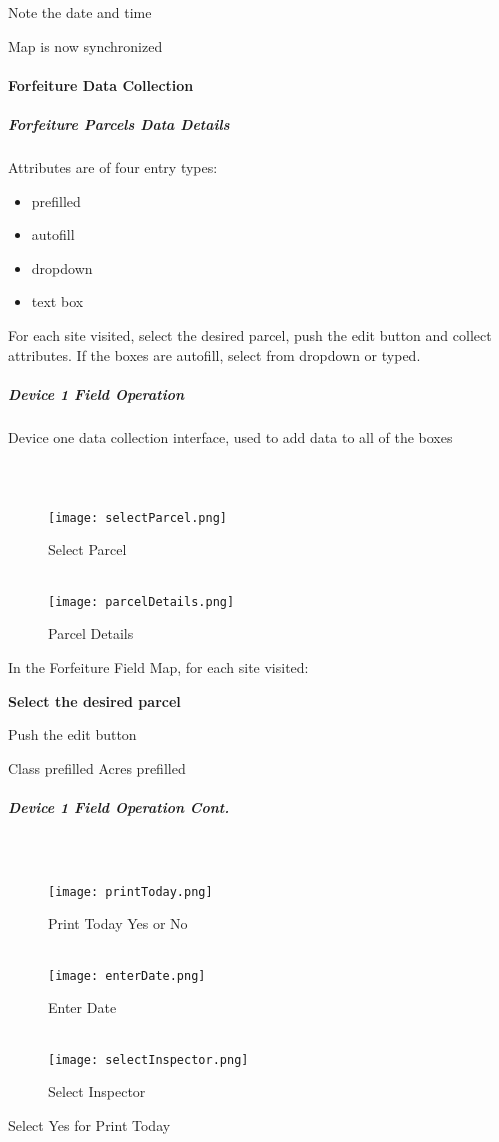 \documentclass[class=article , crop=false, titlepage, twoside, multi={itemize, figure, verbatim}, float=false]{standalone}
\begin{document}
\Large Note the date and time
\vspace{1.5in}

Map is now synchronized

\clearpage
\paragraph{Forfeiture Data Collection}
\subparagraph{Forfeiture Parcels Data Details}
Attributes are of four entry types:\begin{itemize}
\item prefilled
\item autofill
\item dropdown
\item text box \end{itemize}
For each site visited, select the desired parcel, push the edit button and collect attributes.  If the boxes are autofill, select from dropdown or typed.\bigskip 

\clearpage
\subparagraph{Device 1 Field Operation}Device one data collection interface, used to add data to all of the boxes
\subparagraph*{\\}
\begin{wrapfigure}{r}{0.5\textwidth}
\centering
\texttt{[image: selectParcel.png]}
\caption {Select Parcel}
\vspace{.25in}
\HRule \\[.4cm] %
\vspace{.25in}
\texttt{[image: parcelDetails.png]}
\caption{Parcel Details}
\end{wrapfigure}
\vspace{1in}

In the Forfeiture Field Map, for each site visited:\\
\vspace{1in}

\textbf{Select the desired parcel}
\vspace{3in}

Push the \Large edit button 

\clearpage
Class prefilled
Acres prefilled

\clearpage
\subparagraph*{Device 1 Field Operation Cont.}
\subparagraph*{\\}
\begin{wrapfigure}{r}{0.5\textwidth}
\centering
\texttt{[image: printToday.png]}
\caption {Print Today Yes or No}
\vspace{.2in}
\HRule \\[.4cm] %
\vspace{.2in}
\texttt{[image: enterDate.png]}
\caption{Enter Date}
\vspace{.2in}
\HRule \\[.4cm] %
\vspace{.2in}
\texttt{[image: selectInspector.png]}
\caption{Select Inspector}
\end{wrapfigure}
Select Yes for Print Today\\
\vspace{2.5in}
\end{document}
